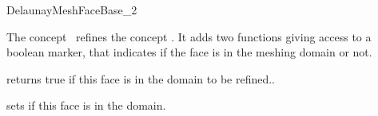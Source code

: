 \begin{ccRefConcept}{DelaunayMeshFaceBase_2}

\ccDefinition

The concept \ccRefName\ refines the concept
  . It adds two functions giving access
  to a boolean marker, that indicates if the face is in the
  meshing domain or not.

\ccRefines
{}


\ccAccessFunctions

{ returns true if this face is in the domain to be refined..}

{ sets if this face is in the domain. }

\ccHasModels
{}

\end{ccRefConcept}

